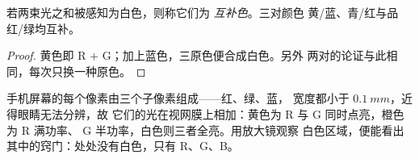 \begin{proposition}[互补色]\label{prop:g11:color-light-sources:complementary}
若两束光之和被感知为白色，则称它们为
\emph{互补色}。三对颜色
黄/蓝、青/红与品红/绿均互补。
\end{proposition}

\begin{proof}
黄色即 R $+$ G；加上蓝色，三原色便合成白色。另外
两对的论证与此相同，每次只换一种原色。
\end{proof}

\begin{example}[屏幕]\label{ex:g11:color-light-sources:screen}
手机屏幕的每个像素由三个子像素组成——红、绿、蓝，
宽度都小于 $\qty{0.1}{mm}$，近得眼睛无法分辨，故
它们的光在视网膜上相加：黄色为 R 与 G 同时点亮，橙色为 R 满功率、
G 半功率，白色则三者全亮。用放大镜观察
白色区域，便能看出其中的窍门：处处没有白色，只有 R、G、B。
\end{example}

